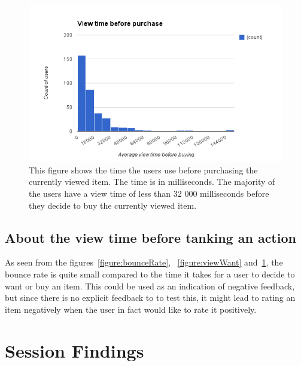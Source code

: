     \begin{figure}[H]
        \includegraphics[width=5in]{image/viewBeforePurchase.png}
        \centering
        \caption[View time before purchasing an item]{This figure shows the time the users use before purchasing the currently viewed item.
        The time is in milliseconds.
        The majority of the users have a view time of less than 32 000 milliseconds before they decide to buy the currently viewed item.}
        \label{figure:viewBuy}
    \end{figure}

\subsection{About the view time before tanking an action}
    As seen from the figures~\ref{figure:bounceRate}, ~\ref{figure:viewWant} and~\ref{figure:viewBuy}, the bounce rate is quite small compared to the time it takes for a user to decide to want or buy an item.
    This could be used as an indication of negative feedback, but since there is no explicit feedback to to test this, it might lead to rating an item negatively when the user in fact would like to rate it positively.



\section{Session Findings}



